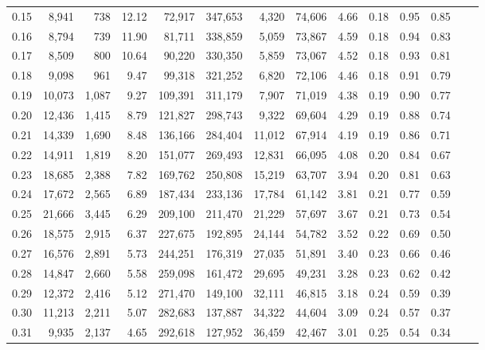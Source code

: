 \begin{tabular}{rrrrrrrrrrrrrr}
0.15 &   8,941 &    738 &   12.12 &   72,917 &  347,653 &   4,320 &  74,606 &  4.66 &  0.18 &  0.95 &      0.85 \\
0.16 &   8,794 &    739 &   11.90 &   81,711 &  338,859 &   5,059 &  73,867 &  4.59 &  0.18 &  0.94 &      0.83 \\
0.17 &   8,509 &    800 &   10.64 &   90,220 &  330,350 &   5,859 &  73,067 &  4.52 &  0.18 &  0.93 &      0.81 \\
0.18 &   9,098 &    961 &    9.47 &   99,318 &  321,252 &   6,820 &  72,106 &  4.46 &  0.18 &  0.91 &      0.79 \\
0.19 &  10,073 &  1,087 &    9.27 &  109,391 &  311,179 &   7,907 &  71,019 &  4.38 &  0.19 &  0.90 &      0.77 \\
0.20 &  12,436 &  1,415 &    8.79 &  121,827 &  298,743 &   9,322 &  69,604 &  4.29 &  0.19 &  0.88 &      0.74 \\
0.21 &  14,339 &  1,690 &    8.48 &  136,166 &  284,404 &  11,012 &  67,914 &  4.19 &  0.19 &  0.86 &      0.71 \\
0.22 &  14,911 &  1,819 &    8.20 &  151,077 &  269,493 &  12,831 &  66,095 &  4.08 &  0.20 &  0.84 &      0.67 \\
0.23 &  18,685 &  2,388 &    7.82 &  169,762 &  250,808 &  15,219 &  63,707 &  3.94 &  0.20 &  0.81 &      0.63 \\
0.24 &  17,672 &  2,565 &    6.89 &  187,434 &  233,136 &  17,784 &  61,142 &  3.81 &  0.21 &  0.77 &      0.59 \\
0.25 &  21,666 &  3,445 &    6.29 &  209,100 &  211,470 &  21,229 &  57,697 &  3.67 &  0.21 &  0.73 &      0.54 \\
0.26 &  18,575 &  2,915 &    6.37 &  227,675 &  192,895 &  24,144 &  54,782 &  3.52 &  0.22 &  0.69 &      0.50 \\
0.27 &  16,576 &  2,891 &    5.73 &  244,251 &  176,319 &  27,035 &  51,891 &  3.40 &  0.23 &  0.66 &      0.46 \\
0.28 &  14,847 &  2,660 &    5.58 &  259,098 &  161,472 &  29,695 &  49,231 &  3.28 &  0.23 &  0.62 &      0.42 \\
0.29 &  12,372 &  2,416 &    5.12 &  271,470 &  149,100 &  32,111 &  46,815 &  3.18 &  0.24 &  0.59 &      0.39 \\
0.30 &  11,213 &  2,211 &    5.07 &  282,683 &  137,887 &  34,322 &  44,604 &  3.09 &  0.24 &  0.57 &      0.37 \\
0.31 &   9,935 &  2,137 &    4.65 &  292,618 &  127,952 &  36,459 &  42,467 &  3.01 &  0.25 &  0.54 &      0.34 \\

\end{tabular}
